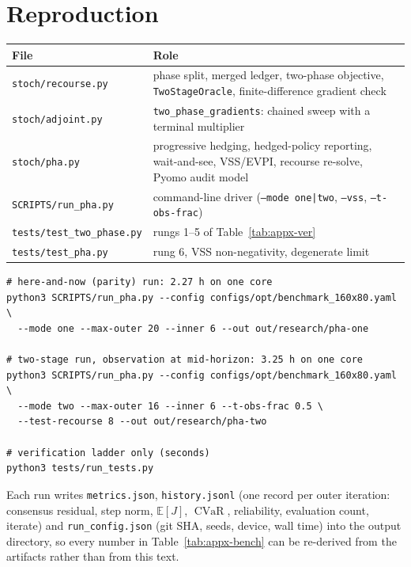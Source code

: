 \documentclass[11pt]{article}
\newcommand{\E}{\mathbb{E}}
\newcommand{\CVaR}{\operatorname{CVaR}}
\begin{document}
\section{Reproduction}

\begin{center}
\small
\begin{tabularx}{\textwidth}{@{}l X@{}}
\toprule
File & Role \\
\midrule
\texttt{stoch/recourse.py} & phase split, merged ledger, two-phase objective,
  \texttt{TwoStageOracle}, finite-difference gradient check \\
\texttt{stoch/adjoint.py} & \texttt{two\_phase\_gradients}: chained sweep with a
  terminal multiplier \\
\texttt{stoch/pha.py} & progressive hedging, hedged-policy reporting, wait-and-see,
  VSS/EVPI, recourse re-solve, Pyomo audit model \\
\texttt{SCRIPTS/run\_pha.py} & command-line driver (\texttt{--mode one|two},
  \texttt{--vss}, \texttt{--t-obs-frac}) \\
\texttt{tests/test\_two\_phase.py} & rungs 1--5 of Table~\ref{tab:appx-ver} \\
\texttt{tests/test\_pha.py} & rung 6, VSS non-negativity, degenerate limit \\
\bottomrule
\end{tabularx}
\end{center}

{\small
\begin{verbatim}
# here-and-now (parity) run: 2.27 h on one core
python3 SCRIPTS/run_pha.py --config configs/opt/benchmark_160x80.yaml \
  --mode one --max-outer 20 --inner 6 --out out/research/pha-one

# two-stage run, observation at mid-horizon: 3.25 h on one core
python3 SCRIPTS/run_pha.py --config configs/opt/benchmark_160x80.yaml \
  --mode two --max-outer 16 --inner 6 --t-obs-frac 0.5 \
  --test-recourse 8 --out out/research/pha-two

# verification ladder only (seconds)
python3 tests/run_tests.py
\end{verbatim}
}

Each run writes \texttt{metrics.json}, \texttt{history.jsonl} (one record per
outer iteration: consensus residual, step norm, $\E[J]$, $\CVaR$, reliability,
evaluation count, iterate) and \texttt{run\_config.json} (git SHA, seeds, device,
wall time) into the output directory, so every number in
Table~\ref{tab:appx-bench} can be re-derived from the artifacts rather than from
this text.
\end{document}
